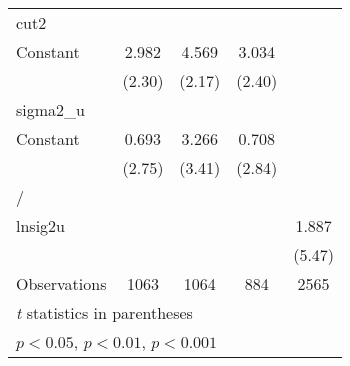 {\begin{longtable}{l*{4}{c}}
\midrule
cut2            &                  &                  &                  &                  \\
Constant        &    2.982\sym{*}  &    4.569\sym{*}  &    3.034\sym{*}  &                  \\
                &   (2.30)         &   (2.17)         &   (2.40)         &                  \\
\midrule
sigma2\_u        &                  &                  &                  &                  \\
Constant        &    0.693\sym{**} &    3.266\sym{***}&    0.708\sym{**} &                  \\
                &   (2.75)         &   (3.41)         &   (2.84)         &                  \\
\midrule
/               &                  &                  &                  &                  \\
lnsig2u         &                  &                  &                  &    1.887\sym{***}\\
                &                  &                  &                  &   (5.47)         \\
\midrule
Observations    &     1063         &     1064         &      884         &     2565         \\
\bottomrule
\multicolumn{5}{l}{\footnotesize \textit{t} statistics in parentheses}\\
\multicolumn{5}{l}{\footnotesize \sym{*} \(p<0.05\), \sym{**} \(p<0.01\), \sym{***} \(p<0.001\)}\\
\end{longtable}
}
